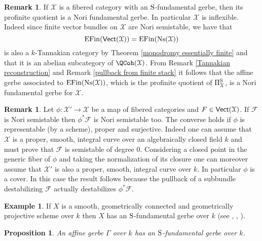 \documentclass[12pt,reqno]{amsart}
\theoremstyle{plain}
\newtheorem{prop}[thm]{Proposition}
\theoremstyle{definition}
\newtheorem{ex}[thm]{Example}
\newtheorem{rmk}[thm]{Remark}
\numberwithin{thm}{section}
\newcounter{x}\setcounter{x}{1}
\theoremstyle{plain}
\begin{document}
\begin{rmk}\label{NSX Tannakian implies inflexible}
If ${\mathcal{X}}$ is a fibered category with an ${\textup{S}}$-fundamental gerbe, then its profinite quotient is
a Nori fundamental gerbe. In particular ${\mathcal{X}}$ is inflexible.
Indeed since finite vector bundles on ${\mathcal{X}}$ are Nori semistable, we have that
 \[
 {{\rm EFin}}({\text{\sf Vect}}({\mathcal{X}})) = {{\rm EFin}}({\textup{Ns}}({\mathcal{X}}))
 \]
is also a $k$-Tannakian category by Theorem \ref{monodromy essentially finite} and that it
is an abelian subcategory of $\QCoh({\mathcal{X}})$. From Remark \ref{Tannakian reconstruction} and
Remark \ref{pullback from finite stack} it follows that the affine gerbe associated to
${{\rm EFin}}({\textup{Ns}}({\mathcal{X}}))$, which is the profinite quotient of $\Pi^{\textup{S}}_{\mathcal{X}}$, is a Nori fundamental
gerbe for ${\mathcal{X}}$.
\end{rmk}

\begin{rmk}\label{functoriality and descent for Nori semistable}
Let $\phi\colon {\mathcal{X}}'{\longrightarrow} {\mathcal{X}}$ be a map of fibered categories and $F\in {\text{\sf Vect}}({\mathcal{X}})$. If ${\mathcal{F}}$ 
is Nori semistable then $\phi^*{\mathcal{F}}$ is Nori semistable too. The converse holds if $\phi$ is 
representable (by a scheme), proper and surjective. Indeed one can assume that ${\mathcal{X}}$ is a proper, smooth, 
integral curve over an algebraically closed field $k$ and must prove that ${\mathcal{F}}$ is semistable 
of degree $0$. Considering a closed point in the generic fiber of $\phi$ and taking the 
normalization of its closure one can moreover assume that ${\mathcal{X}}'$ is also a proper, smooth, 
integral curve over $k$. In particular $\phi$ is a cover. In this case the result follows 
because the pullback of a subbundle destabilizing ${\mathcal{F}}$ actually destabilizes $\phi^*{\mathcal{F}}$.
\end{rmk}

\begin{ex}
 If $X$ is a smooth, geometrically connected and geometrically projective scheme over $k$
then $X$ has an ${\textup{S}}$-fundamental gerbe over $k$ (see \cite{BPS}, \cite{L1}, \cite{L2}).
\end{ex}

\begin{prop}
 An affine gerbe $\Gamma$ over $k$ has an ${\textup{S}}$-fundamental gerbe over $k$.
\end{prop}
\end{document}
